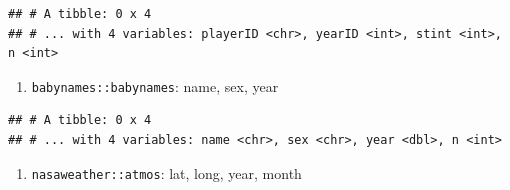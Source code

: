 \documentclass[]{book}
\newenvironment{Shaded}{\begin{snugshade}}{\end{snugshade}}
\newcommand{\DecValTok}[1]{\textcolor[rgb]{0.00,0.00,0.81}{#1}}
\newcommand{\KeywordTok}[1]{\textcolor[rgb]{0.13,0.29,0.53}{\textbf{#1}}}
\newcommand{\NormalTok}[1]{#1}
\newcommand{\OperatorTok}[1]{\textcolor[rgb]{0.81,0.36,0.00}{\textbf{#1}}}
\newcommand{\StringTok}[1]{\textcolor[rgb]{0.31,0.60,0.02}{#1}}
\providecommand{\tightlist}{%
  \setlength{\itemsep}{0pt}\setlength{\parskip}{0pt}}
\theoremstyle{definition}
\theoremstyle{definition}
\theoremstyle{definition}
\theoremstyle{remark}
\begin{document}
\begin{enumerate}
\begin{Shaded}
\end{Shaded}

\begin{verbatim}
## # A tibble: 0 x 4
## # ... with 4 variables: playerID <chr>, yearID <int>, stint <int>, n <int>
\end{verbatim}

  \begin{enumerate}
  \def\labelenumii{\arabic{enumii}.}
  \tightlist
  \item
    \texttt{babynames::babynames}: name, sex, year
  \end{enumerate}

\begin{Shaded}
\end{Shaded}

\begin{verbatim}
## # A tibble: 0 x 4
## # ... with 4 variables: name <chr>, sex <chr>, year <dbl>, n <int>
\end{verbatim}

  \begin{enumerate}
  \def\labelenumii{\arabic{enumii}.}
  \tightlist
  \item
    \texttt{nasaweather::atmos}: lat, long, year, month
  \end{enumerate}

\begin{Shaded}
\end{Shaded}


\end{enumerate}
\end{document}
